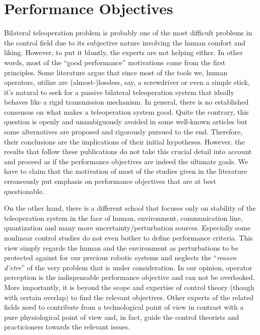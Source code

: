 \chapter{Performance Objectives}
\label{chap:perf}


Bilateral teleoperation problem is probably one of the most difficult problems in the control field due to its 
subjective nature involving the human comfort and liking. However, to put it bluntly, the experts are not helping 
either. In other words, most of the \enquote{good performance} motivations come from the first principles. Some 
literature argue that since most of the tools we, human operators, utilize are (almost-)lossless, say, a 
screwdriver or even a simple stick, it's natural to seek for a passive bilateral teleoperation system that 
ideally behaves like a rigid transmission mechanism. In general, there is no established consensus on what makes 
a teleoperation system good. Quite the contrary, this question is openly and unambiguously avoided in some 
well-known articles but some alternatives are proposed and rigorously pursued to the end. Therefore, their conclusions 
are the implications of their initial hypotheses. However, the results that follow these publications do not take 
this crucial detail into account and proceed as if the performance objectives are indeed the ultimate goals. 
We have to claim that the motivation of most of the studies given in the literature erroneously put emphasis 
on performance objectives that are at best questionable. 

On the other hand, there is a different school that focuses only on stability of the teleoperation system in the 
face of human, environment, communication line, quantization and many more uncertainty/perturbation sources. 
Especially some nonlinear control studies do not even bother to define performance criteria. This view simply 
regards the human and the environment as perturbations to be protected against for our precious robotic systems 
and neglects the \enquote{\emph{reason d'etre}} of the very problem that is under consideration. In our opinion, 
operator perception is the indispensable performance objective and can not be overlooked. More importantly, it is
beyond the scope and expertise of control theory (though with certain overlap) to find the relevant 
objectives. Other experts of the related fields need to contribute from a technological point of view in 
contrast with a pure physiological point of view and, in fact, guide the control theorists and practicioners towards 
the relevant issues. 

